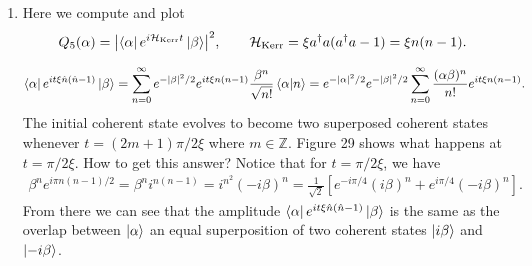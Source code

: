 \documentclass{article}
\theoremstyle{definition}
\newcommand{\ham}{\mathcal{H}}
\newcommand{\al}{\alpha}
\newcommand{\be}{\beta}
\newcommand{\f}[2]{\frac{#1}{#2}}
\newcommand{\lb}{\left[}
\newcommand{\rb}{\right]}
\begin{document}
\begin{enumerate}[label=\alph*)]
	
	\item Here we compute and plot 
	\begin{align*}
		Q_5(\al) = \abs{\bra{\al}  e^{i\ham_\text{Kerr} t}   \ket{\be}}^2, \quad\quad 
		\ham_\text{Kerr} = \xi a^\dagger a (a^\dagger a - 1) = \xi n(n-1).
	\end{align*}

	\begin{align*}
		\bra{\al} e^{it\xi \hat{n} (\hat{n}-1)} \ket{\be} =  \sum_{n=0}^\infty e^{-\abs{\be}^2/2} e^{it\xi n(n-1)} \f{\be^n}{\sqrt{n!}} \braket{\al}{n} = e^{-\abs{\al}^2/2} e^{-\abs{\be}^2/2} \sum_{n=0}^\infty \f{(\al\be)^n}{n!} e^{it \xi n(n-1)}.
	\end{align*}		
	The initial coherent state evolves to become two superposed coherent states whenever $t = (2m+1) \pi / 2\xi$ where $m\in \mathbb{Z}$. Figure 29 shows what happens at $t = \pi/2\xi$. How to get this answer? Notice that for $t = \pi/2\xi$, we have
	\begin{align*}
	\be^n e^{i\pi n(n-1)/2} = \be^n i^{n(n-1)} = i^{n^2} (-i\be)^n =  \f{1}{\sqrt{2}}\lb  e^{-i\pi/4} (i\be)^n + e^{i\pi/4} (-i\be)^n  \rb.
	\end{align*}
	From there we can see that the amplitude $\bra{\al} e^{it\xi \hat{n} (\hat{n}-1)} \ket{\be} $ is the same as the overlap between $\ket{\al}$ an equal superposition of two coherent states $\ket{i\be}$ and $\ket{-i\be}$.
	

\end{enumerate}
\end{document}
